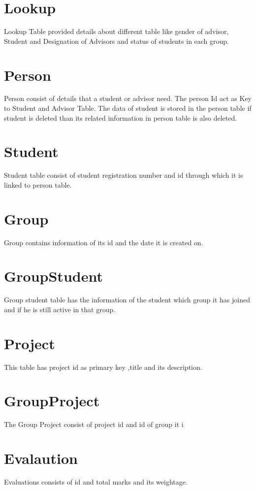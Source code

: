 \documentclass[a4paper, 12pt, oneside]{uet_thesis}
\begin{document}
\section{Lookup}
Lookup Table provided details about different table like gender of advisor, Student and Designation of Advisors and status of students in each group.

\section{Person}
Person consist of details that a student or advisor need. The person Id act as Key to Student and Advisor Table. The data of student is stored in the person table if student is deleted than its related information in person table is also deleted.

\section{Student}
Student table consist of student registration number and id through which it is linked to person table.

\section{Group}
Group contains information of its id and the date it is created on. 

\section{GroupStudent}
Group student table has the information of the student which group it has joined and if he is still active in that group.

\section{Project}
This table has project id as primary key ,title  and its description.

\section{GroupProject}
The Group Project consist of project id and id of group it i

\section{Evalaution}
Evaluations consists of id and total marks and its weightage.
\end{document}
